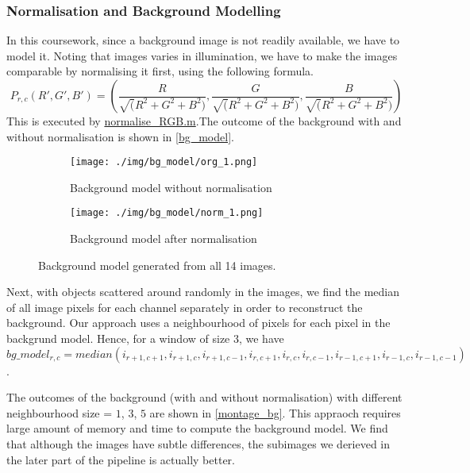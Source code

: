 \documentclass[main.tex]{subfiles}
\begin{document}
\subsubsection*{Normalisation and Background Modelling}
In this coursework, since a background image is not readily available, we have to model it. Noting that images varies in illumination, we have to make the images comparable by normalising it first, using the following formula.
$$ P_{r,c}(R',G',B')=(\frac{R}{\sqrt(R^2+G^2+B^2)},\frac{G}{\sqrt(R^2+G^2+B^2)},\frac{B}{\sqrt(R^2+G^2+B^2)})$$
This is executed by \hyperlink{normRGB}{normalise\_RGB.m}.The outcome of the background with and without normalisation is shown in \autoref{bg_model}.

\begin{figure}[!h]
  \centering
  \begin{subfigure}[b]{.45\textwidth}
    \centering
    \texttt{[image: ./img/bg\_model/org\_1.png]}
    \caption{Background model without normalisation}
  \end{subfigure}
  \begin{subfigure}[b]{.45\textwidth}
    \centering
    \texttt{[image: ./img/bg\_model/norm\_1.png]}
    \caption{Background model after normalisation}
  \end{subfigure}
  \caption{Background model generated from all 14 images.}
  \label{bg_model}
\end{figure}

Next, with objects scattered around randomly in the images, we find the median of all image pixels for each channel separately in order to reconstruct the background.
Our approach uses a neighbourhood of pixels for each pixel in the backgrund model. Hence, for a window of size 3, we have
$bg\_model_{r,c} = median(i_{r+1,c+1}, i_{r+1,c}, i_{r+1,c-1},
                          i_{r,c+1}, i_{r,c}, i_{r,c-1},
                          i_{r-1,c+1}, i_{r-1,c}, i_{r-1,c-1}) $.

The outcomes of the background (with and without normalisation) with different neighbourhood size = $1$, $3$, $5$ are shown in \autoref{montage_bg}. This appraoch requires large amount of memory and time to compute the background model. We find that although the images have subtle differences, the subimages we derieved in the later part of the pipeline is actually better.
\end{document}
